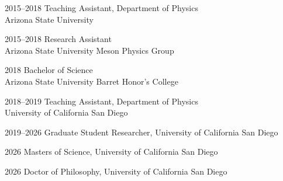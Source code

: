 \documentclass[12pt]{ucsddissertation}
\begin{document}
\begin{vita}
\noindent
\begin{cv}{}
\begin{cvlist}{}
\item[2015--2018] Teaching Assistant, Department of Physics \\Arizona State University
\item[2015--2018] Research Assistant \\Arizona State University Meson Physics Group
\item[2018] Bachelor of Science \\Arizona State University Barret Honor's College
\item[2018--2019] Teaching Assistant, Department of Physics \\University of California San Diego
\item[2019--2026] Graduate Student Researcher, University of California San
Diego
\item[2026] Masters of Science, University of California San Diego
\item[2026] Doctor of Philosophy, University of California San Diego
\end{cvlist}
\end{cv}


\end{vita}
\end{document}
